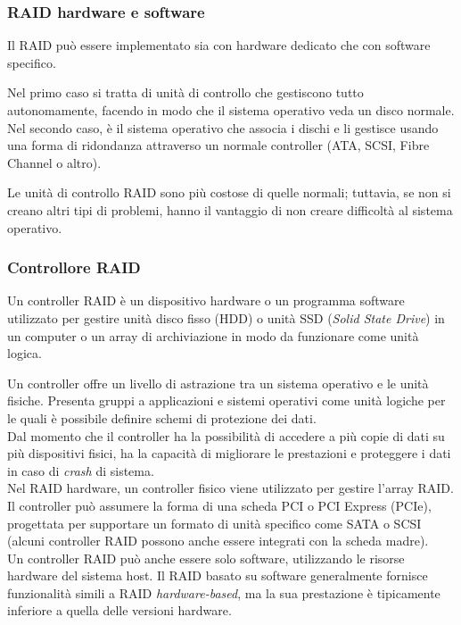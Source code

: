 \item
\subsubsection{RAID hardware e software}
Il RAID pu\`{o} essere implementato sia con hardware dedicato che con software specifico.

Nel primo caso si tratta di unit\`{a} di controllo che gestiscono tutto autonomamente, facendo in modo che il sistema operativo veda un disco normale. 
Nel secondo caso, \`{e} il sistema operativo che associa i dischi e li gestisce usando una forma di ridondanza attraverso un normale controller (ATA, SCSI, Fibre Channel o altro).

Le unit\`{a} di controllo RAID sono pi\`{u} costose di quelle normali; tuttavia, se non si creano altri tipi di problemi, hanno il vantaggio di non creare difficolt\`{a} al sistema operativo\cite{etichetta9}.

\item
\subsubsection{Controllore RAID}
Un controller RAID \`{e} un dispositivo hardware o un programma software utilizzato per gestire unit\`{a} disco fisso (HDD) o unit\`{a} SSD (\textit{Solid State Drive}) in un computer o un array di archiviazione in modo da funzionare come unit\`{a} logica.

Un controller offre un livello di astrazione tra un sistema operativo e le unit\`{a} fisiche. Presenta gruppi a applicazioni e sistemi operativi come unit\`{a} logiche per le quali \`{e} possibile definire schemi di protezione dei dati. \\
Dal momento che il controller ha la possibilit\`{a} di accedere a pi\`{u} copie di dati su pi\`{u} dispositivi fisici, ha la capacit\`{a} di migliorare le prestazioni e proteggere i dati in caso di \textit{crash} di sistema\cite{etichetta12}.\\

Nel RAID hardware, un controller fisico viene utilizzato per gestire l'array RAID. Il controller pu\`{o} assumere la forma di una scheda PCI o PCI Express (PCIe), progettata per supportare un formato di unit\`{a} specifico come SATA o SCSI (alcuni controller RAID possono anche essere integrati con la scheda madre). \\
Un controller RAID pu\`{o} anche essere solo software, utilizzando le risorse hardware del sistema host. Il RAID basato su software generalmente fornisce funzionalit\`{a} simili a RAID \textit{hardware-based}, ma la sua prestazione \`{e} tipicamente inferiore a quella delle versioni hardware\cite{etichetta12}.

